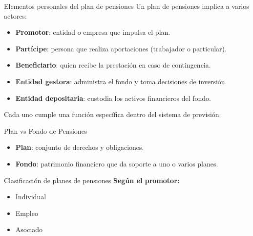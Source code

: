\documentclass[
  ignorenonframetext,
  aspectratio=54,
  spanish,
]{beamer}
\providecommand{\tightlist}{%
  \setlength{\itemsep}{0pt}\setlength{\parskip}{0pt}}
\begin{document}
\begin{frame}{Elementos personales del plan de pensiones}
\label{elementos-personales-del-plan-de-pensiones}
Un plan de pensiones implica a varios actores:

\begin{itemize}
\tightlist
\item
  \textbf{Promotor}: entidad o empresa que impulsa el plan.
\item
  \textbf{Partícipe}: persona que realiza aportaciones (trabajador o
  particular).
\item
  \textbf{Beneficiario}: quien recibe la prestación en caso de
  contingencia.
\item
  \textbf{Entidad gestora}: administra el fondo y toma decisiones de
  inversión.
\item
  \textbf{Entidad depositaria}: custodia los activos financieros del
  fondo.
\end{itemize}

\begin{tcolorbox}[enhanced jigsaw, rightrule=.15mm, colback=white, arc=.35mm, colframe=quarto-callout-note-color-frame, bottomrule=.15mm, left=2mm, toptitle=1mm, colbacktitle=quarto-callout-note-color!10!white, leftrule=.75mm, bottomtitle=1mm, titlerule=0mm, title=\textcolor{quarto-callout-note-color}{\faInfo}\hspace{0.5em}{Nota}, opacityback=0, coltitle=black, toprule=.15mm, opacitybacktitle=0.6, breakable]

Cada uno cumple una función específica dentro del sistema de previsión.

\end{tcolorbox}
\end{frame}

\begin{frame}{Plan vs Fondo de Pensiones}
\label{plan-vs-fondo-de-pensiones}
\begin{itemize}
\tightlist
\item
  \textbf{Plan}: conjunto de derechos y obligaciones.
\item
  \textbf{Fondo}: patrimonio financiero que da soporte a uno o varios
  planes.
\end{itemize}
\end{frame}

\begin{frame}{Clasificación de planes de pensiones}
\label{clasificaciuxf3n-de-planes-de-pensiones}
\textbf{Según el promotor:}

\begin{itemize}
\tightlist
\item
  Individual
\item
  Empleo
\item
  Asociado
\end{itemize}
\end{frame}
\end{document}

